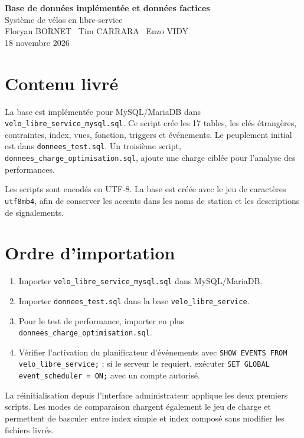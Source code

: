 \documentclass[11pt,a4paper]{article}
\begin{document}
\begin{center}
{\LARGE\textbf{Base de données implémentée et données factices}}\\[0.4em]
{\large Système de vélos en libre-service}\\[0.8em]
Floryan BORNET \textperiodcentered\ Tim CARRARA \textperiodcentered\ Enzo VIDY\\
18 novembre 2026
\end{center}

\section{Contenu livré}
La base est implémentée pour MySQL/MariaDB dans \texttt{velo\_libre\_service\_mysql.sql}. Ce script crée les 17 tables, les clés étrangères, contraintes, index, vues, fonction, triggers et événements. Le peuplement initial est dans \texttt{donnees\_test.sql}. Un troisième script, \texttt{donnees\_charge\_optimisation.sql}, ajoute une charge ciblée pour l'analyse des performances.

Les scripts sont encodés en UTF-8. La base est créée avec le jeu de caractères \texttt{utf8mb4}, afin de conserver les accents dans les noms de station et les descriptions de signalements.

\section{Ordre d'importation}
\begin{enumerate}
  \item Importer \texttt{velo\_libre\_service\_mysql.sql} dans MySQL/MariaDB.
  \item Importer \texttt{donnees\_test.sql} dans la base \texttt{velo\_libre\_service}.
  \item Pour le test de performance, importer en plus \texttt{donnees\_charge\_optimisation.sql}.
  \item Vérifier l'activation du planificateur d'événements avec \texttt{SHOW EVENTS FROM velo\_libre\_service;} ; si le serveur le requiert, exécuter \texttt{SET GLOBAL event\_scheduler = ON;} avec un compte autorisé.
\end{enumerate}

La réinitialisation depuis l'interface administrateur applique les deux premiers scripts. Les modes de comparaison chargent également le jeu de charge et permettent de basculer entre index simple et index composé sans modifier les fichiers livrés.
\end{document}

